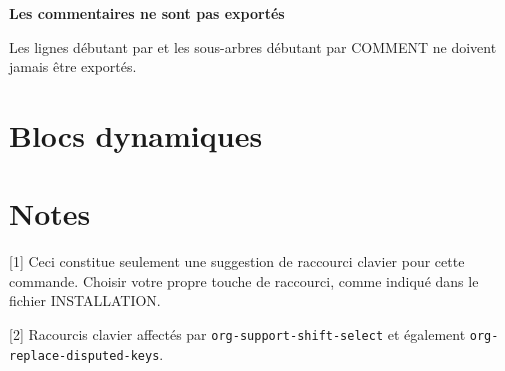 

{\bf Les commentaires ne sont pas export\'es }

Les lignes d\'ebutant par \kbd{\#} et les sous-arbres d\'ebutant par COMMENT ne doivent jamais \^etre export\'es.


\section{Blocs dynamiques}


\section{Notes}
[1] Ceci constitue seulement une suggestion de raccourci clavier pour cette commande. Choisir votre propre touche de raccourci, comme indiqu\'e dans le fichier INSTALLATION.

[2] Racourcis clavier affect\'es par {\tt org-support-shift-select} et \'egalement  {\tt org-replace-disputed-keys}.

\copyrightnotice

\bye




